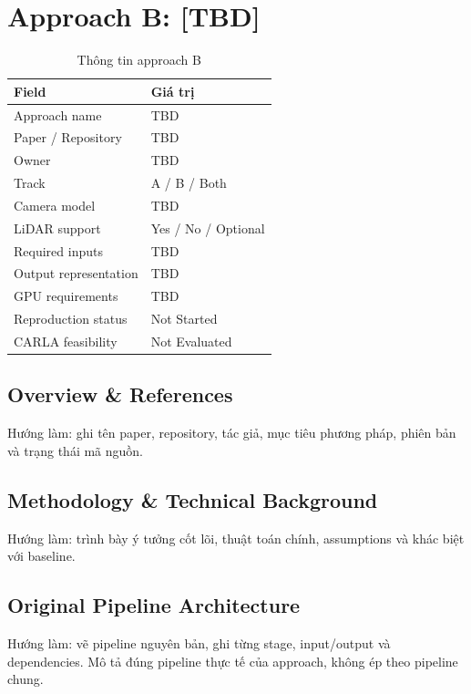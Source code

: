 \chapter{Approach B: [TBD]}

\begin{table}[H]
  \centering
  \caption{Thông tin approach B}
  \begin{tabularx}{\linewidth}{l X}
    \toprule
    \textbf{Field} & \textbf{Giá trị} \\
    \midrule
    Approach name & TBD \\
    Paper / Repository & TBD \\
    Owner & TBD \\
    Track & A / B / Both \\
    Camera model & TBD \\
    LiDAR support & Yes / No / Optional \\
    Required inputs & TBD \\
    Output representation & TBD \\
    GPU requirements & TBD \\
    Reproduction status & Not Started \\
    CARLA feasibility & Not Evaluated \\
    \bottomrule
  \end{tabularx}
\end{table}

\section{Overview \& References}

Hướng làm: ghi tên paper, repository, tác giả, mục tiêu phương pháp, phiên bản và trạng thái mã nguồn.

\section{Methodology \& Technical Background}

Hướng làm: trình bày ý tưởng cốt lõi, thuật toán chính, assumptions và khác biệt với baseline.

\section{Original Pipeline Architecture}

Hướng làm: vẽ pipeline nguyên bản, ghi từng stage, input/output và dependencies.
Mô tả đúng pipeline thực tế của approach, không ép theo pipeline chung.

